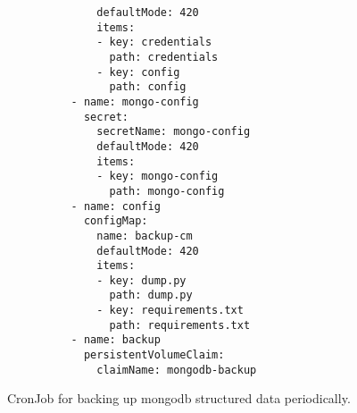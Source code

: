 \begin{code}
\begin{verbatim}
              defaultMode: 420
              items:
              - key: credentials
                path: credentials
              - key: config
                path: config
          - name: mongo-config
            secret:
              secretName: mongo-config
              defaultMode: 420
              items:
              - key: mongo-config
                path: mongo-config
          - name: config
            configMap:
              name: backup-cm
              defaultMode: 420
              items:
              - key: dump.py
                path: dump.py
              - key: requirements.txt
                path: requirements.txt
          - name: backup
            persistentVolumeClaim:
              claimName: mongodb-backup
\end{verbatim}
\caption[]{CronJob for backing up mongodb structured data periodically.}
\end{code}
